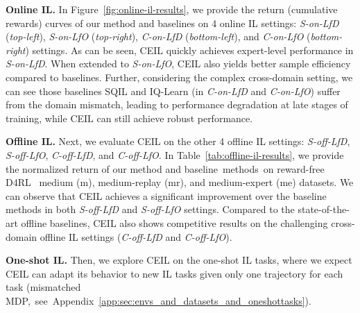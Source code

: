 \textbf{Online IL.} 
In Figure~\ref{fig:online-il-results}, we provide the return (cumulative rewards) curves of our method and baselines on 4 online IL settings: \textit{S-on-LfD} (\textit{top-left}), \textit{S-on-LfO} (\textit{top-right}), \textit{C-on-LfD} (\textit{bottom-left}), and \textit{C-on-LfO} (\textit{bottom-right}) settings. 
As can be seen, CEIL quickly achieves expert-level performance in \textit{S-on-LfD}. 
When extended to \textit{S-on-LfO}, CEIL also yields better sample efficiency compared to baselines. 
Further, considering the complex cross-domain setting, we can see those baselines SQIL and IQ-Learn (in \textit{C-on-LfD} and \textit{C-on-LfO}) suffer from the domain mismatch, leading to performance degradation at late stages of training, while CEIL can still achieve robust performance.












\textbf{Offline IL.} 
Next, we evaluate CEIL on the other 4 offline IL settings: \textit{S-off-LfD}, \textit{S-off-LfO}, \textit{C-off-LfD}, and \textit{C-off-LfO}. In Table~\ref{tab:offline-il-results}, we provide the normalized return of our method and baseline~methods~on 
reward-free D4RL~\citep{fu2020d4rl}
 medium (m), medium-replay (mr), and medium-expert (me) datasets. 
We can observe that CEIL achieves a significant improvement over the baseline methods in both \textit{S-off-LfD} and \textit{S-off-LfO} settings. Compared to the state-of-the-art offline baselines, CEIL also shows competitive results on the challenging cross-domain offline IL settings (\textit{C-off-LfD} and \textit{C-off-LfO}). 





\textbf{One-shot IL.} Then, we explore CEIL on the one-shot IL tasks, where we expect CEIL can adapt its behavior to new IL tasks given only one trajectory for each task (mismatched MDP,~see~Appendix~\ref{app:sec:envs_and_datasets_and_oneshottasks}). 



